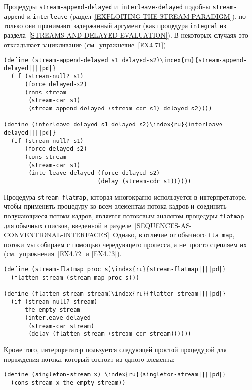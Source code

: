 {Процедуры {\tt stream-append-delayed} и
{\tt interleave-delayed} подобны {\tt stre\-am-append} и
{\tt interleave} 
(раздел~\ref{EXPLOITING-THE-STREAM-PARADIGM}), но только они
принимают задержанный аргумент (как процедура {\tt integral} из
раздела~\ref{STREAMS-AND-DELAYED-EVALUATION}).  В
некоторых случаях это откладывает зацикливание 
(см.~упражнение~\ref{EX4.71}).

\sloppy
} %
\begin{Verbatim}[fontsize=\small]
(define (stream-append-delayed s1 delayed-s2)\index{ru}{stream-append-delayed||||pd|}
  (if (stream-null? s1)
      (force delayed-s2)
      (cons-stream
       (stream-car s1)
       (stream-append-delayed (stream-cdr s1) delayed-s2))))

(define (interleave-delayed s1 delayed-s2)\index{ru}{interleave-delayed||||pd|}
  (if (stream-null? s1)
      (force delayed-s2)
      (cons-stream
       (stream-car s1)
       (interleave-delayed (force delayed-s2)
                           (delay (stream-cdr s1))))))
\end{Verbatim}

Процедура {\tt stream-flatmap}, которая
многократно используется в интерпретаторе, чтобы применить процедуру
ко всем элементам потока кадров и соединить получающиеся потоки
кадров, является потоковым аналогом процедуры {\tt flatmap} для
обычных списков, введенной в 
разделе~\ref{SEQUENCES-AS-CONVENTIONAL-INTERFACES}.  Однако, в
отличие от обычного {\tt flatmap}, потоки мы собираем с помощью
чередующего процесса, а не просто сцепляем их 
(см.~упражнения~\ref{EX4.72} и \ref{EX4.73}).

\begin{Verbatim}[fontsize=\small]
(define (stream-flatmap proc s)\index{ru}{stream-flatmap||||pd|}
  (flatten-stream (stream-map proc s)))

(define (flatten-stream stream)\index{ru}{flatten-stream||||pd|}
  (if (stream-null? stream)
      the-empty-stream
      (interleave-delayed
       (stream-car stream)
       (delay (flatten-stream (stream-cdr stream))))))
\end{Verbatim}

Кроме того, интерпретатор пользуется следующей простой
процедурой для порождения потока, который состоит из одного элемента:

\begin{Verbatim}[fontsize=\small]
(define (singleton-stream x) \index{ru}{singleton-stream||||pd|}
  (cons-stream x the-empty-stream))
\end{Verbatim}

